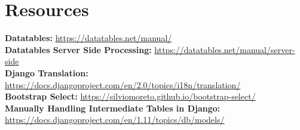 \documentclass{article}
\begin{document}
\section{Resources}
\textbf{Datatables:} \url{https://datatables.net/manual/}
\\\textbf{Datatables Server Side Processing:} \url{https://datatables.net/manual/server-side}
\\\textbf{Django Translation:} \url{https://docs.djangoproject.com/en/2.0/topics/i18n/translation/}
\\\textbf{Bootstrap Select:} \url{https://silviomoreto.github.io/bootstrap-select/}
\\\textbf{Manually Handling Intermediate Tables in Django: }\url{https://docs.djangoproject.com/en/1.11/topics/db/models/}
\end{document}

